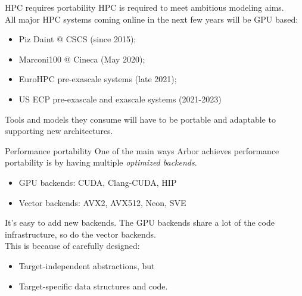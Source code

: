 \documentclass[aspectratio=43]{beamer}
\newcommand{\arbor}{{\ttfamily Arbor}\xspace}
\begin{document}
\begin{frame}[fragile]{HPC requires portability}
    HPC is required to meet ambitious modeling aims.
    \\ \vspace{15pt}
    All major HPC systems coming online in the next few years will be GPU based:
    \begin{itemize}
        \item Piz Daint @ CSCS (since 2015);
        \item Marconi100 @ Cineca (May 2020);
        \item EuroHPC pre-exascale systems (late 2021);
        \item US ECP pre-exascale and exascale systems (2021-2023)
    \end{itemize}
    \vspace{15pt}
    Tools and models they consume will have to be portable and adaptable to supporting new architectures.
\end{frame}

\begin{frame}[fragile]{Performance portability}
    One of the main ways \arbor achieves performance portability is by having multiple \emph{optimized backends}.  
    \begin{itemize} 
        \item GPU backends: CUDA, Clang-CUDA, HIP 
        \item Vector backends: AVX2, AVX512, Neon, SVE
    \end{itemize} 
    \vspace{15pt}
    It's easy to add new backends. The GPU backends share a lot of the code infrastructure, so do the vector backends.\\
    This is because of carefully designed: 
    \begin{itemize}
        \item Target-independent abstractions, but
        \item Target-specific data structures and code.
    \end{itemize} 
   
\end{frame}
\end{document}
